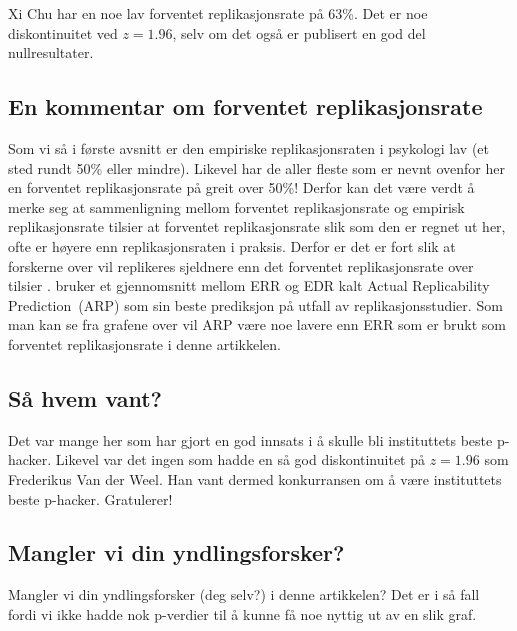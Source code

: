 \documentclass[doc,norsk]{apa7}
\begin{document}
Xi Chu har en noe lav forventet replikasjonsrate på 63\%. Det er noe diskontinuitet ved $z=1.96$, selv om det også er publisert en god del nullresultater.

\subsection{En kommentar om forventet replikasjonsrate}
Som vi så i første avsnitt er den empiriske replikasjonsraten i psykologi lav (et sted rundt 50\% eller mindre). Likevel har de aller fleste som er nevnt ovenfor her en forventet replikasjonsrate på greit over 50\%! Derfor kan det være verdt å merke seg at sammenligning mellom forventet replikasjonsrate og empirisk replikasjonsrate tilsier at forventet replikasjonsrate slik som den er regnet ut her, ofte er høyere enn replikasjonsraten i praksis. Derfor er det er fort slik at forskerne over vil replikeres sjeldnere enn det forventet replikasjonsrate over tilsier \parencite{z-curve-implementasjon, z-curve-mot-empiri}. \textcite{arp} bruker et gjennomsnitt mellom ERR og EDR kalt \guillemetleft Actual Replicability Prediction\guillemetright\ (ARP) som sin beste prediksjon på utfall av replikasjonsstudier. Som man kan se fra grafene over vil ARP være noe lavere enn ERR som er brukt som forventet replikasjonsrate i denne artikkelen.

\subsection{Så hvem vant?}
Det var mange her som har gjort en god innsats i å skulle bli instituttets beste p-hacker. Likevel var det ingen som hadde en så god diskontinuitet på $z=1.96$ som Frederikus Van der Weel. Han vant dermed konkurransen om å være instituttets beste p-hacker. Gratulerer!

\subsection{Mangler vi din yndlingsforsker?}

Mangler vi din yndlingsforsker (deg selv?) i denne artikkelen? Det er i så fall fordi vi ikke hadde nok p-verdier til å kunne få noe nyttig ut av en slik graf.
\end{document}
